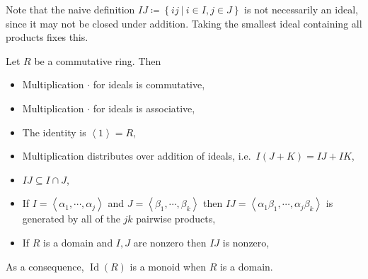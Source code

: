 \begin{remark}

Note that the naive definition
\(IJ \coloneqq\left\{{ij{~\mathrel{\Big|}~}i\in I, j\in J}\right\}\) is
not necessarily an ideal, since it may not be closed under addition.
Taking the smallest ideal containing all products fixes this.

\end{remark}

\begin{proposition}

Let \(R\) be a commutative ring. Then

\begin{itemize}
\tightlist
\item
  Multiplication \(\cdot\) for ideals is commutative,
\item
  Multiplication \(\cdot\) for ideals is associative,
\item
  The identity is \(\left\langle{ 1 }\right\rangle= R\),
\item
  Multiplication distributes over addition of ideals,
  i.e.~\(I(J+K) = IJ + IK\),
\item
  \(IJ \subseteq I \cap J\),
\item
  If \(I = \left\langle{ \alpha_1, \cdots, \alpha_j }\right\rangle\) and
  \(J = \left\langle{ \beta_1, \cdots, \beta_k }\right\rangle\) then
  \(IJ = \left\langle{ \alpha_1 \beta_1, \cdots, \alpha_j \beta_k }\right\rangle\)
  is generated by all of the \(jk\) pairwise products,
\item
  If \(R\) is a domain and \(I, J\) are nonzero then \(IJ\) is nonzero,
\end{itemize}

As a consequence, \(\operatorname{Id}(R)\) is a monoid when \(R\) is a
domain.

\end{proposition}

